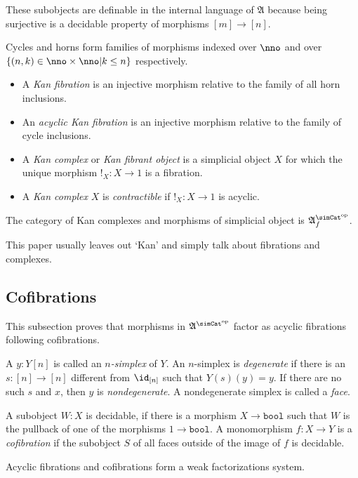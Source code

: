 \documentclass{tac}
\newcommand\set[1]{\left\{#1\right\}}
\newcommand\dual{^{\mathrm{op}}}
\newcommand\s{^{\simCat\dual}}
\newcommand\bang{!}
\newcommand\of{:}
\newcommand\f{_f}
\newcommand\bool{\mathtt{bool}}
\newcommand\ambient{\mathfrak A}
\begin{document}
These subobjects are definable in the internal language of $\ambient$ because being surjective is a decidable property of morphisms $[m]\to[n]$.

\begin{definition} Cycles and horns form families of morphisms indexed over $\nno$ and over $\set{(n,k)\in\nno\times\nno| k\leq n }$ respectively.
\begin{itemize}
\item A \emph{Kan fibration} is an injective morphism relative to the family of all horn inclusions.
\item An \emph{acyclic Kan fibration} is an injective morphism relative to the family of cycle inclusions.
\item A \emph{Kan complex} or \emph{Kan fibrant object} is a simplicial object $X$ for which the unique morphism $\bang_X\of X\to 1$ is a fibration.
\item A \emph{Kan complex} $X$ is \emph{contractible} if $\bang_X\of X\to 1$ is acyclic.
\end{itemize}\label{Kan}

The category of Kan complexes and morphisms of simplicial object is $\ambient\s\f$.
\end{definition}
This paper usually leaves out `Kan' and simply talk about fibrations and complexes.

\subsection{Cofibrations}
This subsection proves that morphisms in $\ambient\s$ factor as acyclic fibrations following cofibrations. 

\begin{definition} A $y\of Y[n]$ is called an \emph{$n$-simplex} of $Y$. An $n$-simplex is \emph{degenerate} if there is an $s\of [n]\to [n]$ different from $\id_{[n]}$ such that $Y(s)(y)=y$. If there are no such $s$ and $x$, then $y$ is \emph{nondegenerate}. A nondegenerate simplex is called a \emph{face}. 

A subobject $W\of X$ is decidable, if there is a morphism $X\to\bool$ such that $W$ is the pullback of one of the morphisms $1\to\bool$. A monomorphism $f\of X\to Y$ is a \emph{cofibration} if the subobject $S$ of all faces outside of the image of $f$ is decidable. \label{cofibration}
\end{definition}

\begin{lemma} Acyclic fibrations and cofibrations form a weak factorizations system.
\end{lemma}
\end{document}
